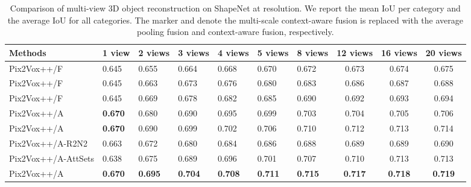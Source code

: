 \documentclass[twocolumn]{svjour3}
\begin{document}
\begin{table*}[!t]
  \caption{Comparison of multi-view 3D object reconstruction on ShapeNet at  resolution. We report the mean IoU per category and the average IoU for all categories. The marker  and  denote the multi-scale context-aware fusion is replaced with the average pooling fusion and context-aware fusion, respectively.}
  \centering
  \begin{tabularx}{\linewidth}{lYYYYYYccc}
    \toprule
    
    Methods     & 1 view         & 2 views        & 3 views
                & 4 views        & 5 views        & 8 views
                & 12 views       & 16 views       & 20 views \\
    \midrule
    Pix2Vox++/F \hspace{.7mm}
                & 0.645          & 0.655          & 0.664
                & 0.668          & 0.670          & 0.672 
                & 0.673          & 0.674          & 0.675 \\
    Pix2Vox++/F \hspace{.7mm}
                & 0.645          & 0.663          & 0.673
                & 0.676          & 0.680          & 0.683 
                & 0.686          & 0.687          & 0.688 \\
    Pix2Vox++/F  & 0.645         & 0.669          & 0.678
                & 0.682          & 0.685          & 0.690
                & 0.692          & 0.693          & 0.694 \\
    \midrule
    \midrule
    Pix2Vox++/A \hspace{.1mm}
                & \bf{0.670}     & 0.680          & 0.690
                & 0.695          & 0.699          & 0.703
                & 0.704          & 0.705          & 0.706 \\
    Pix2Vox++/A \hspace{.1mm}
                & \bf{0.670}     & 0.690          & 0.699
                & 0.702          & 0.706          & 0.710
                & 0.712          & 0.713          & 0.714 \\
    Pix2Vox++/A-R2N2
                & 0.663          & 0.672          & 0.680
                & 0.684          & 0.686          & 0.688
                & 0.689          & 0.689          & 0.690 \\
    Pix2Vox++/A-AttSets
                & 0.638          & 0.675          & 0.689
                & 0.696          & 0.701          & 0.707
                & 0.710          & 0.713          & 0.713 \\
    \midrule
    Pix2Vox++/A & \bf{0.670}     & \bf{0.695}     & \bf{0.704}
                & \bf{0.708}     & \bf{0.711}     & \bf{0.715}
                & \bf{0.717}     & \bf{0.718}     & \bf{0.719} \\
    \bottomrule
  \end{tabularx}
  \label{tab:shapenet-context-aware-fusion}
\end{table*}
\end{document}

